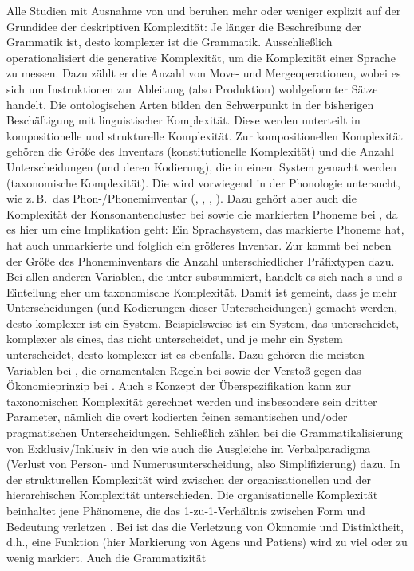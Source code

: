 Alle Studien mit Ausnahme von \citet{Sampson2001} und \citet{Garzonio2016} beruhen mehr oder weniger explizit auf der Grundidee der deskriptiven Komplexität: Je länger die Beschreibung der Grammatik ist, desto komplexer ist die Grammatik. Ausschließlich \citet{Garzonio2016} operationalisiert die generative Komplexität, um die Komplexität einer Sprache zu messen. Dazu zählt er die Anzahl von Move- und Mergeoperationen, wobei es sich um Instruktionen zur Ableitung (also Produktion) wohlgeformter Sätze handelt. Die ontologischen Arten bilden den Schwerpunkt in der bisherigen Beschäftigung mit linguistischer Komplexität. Diese werden unterteilt in kompositionelle und strukturelle Komplexität. Zur kompositionellen Komplexität gehören die Größe des Inventars (konstitutionelle Komplexität) und die Anzahl Unterscheidungen (und deren Kodierung), die in einem System gemacht werden (taxonomische Komplexität). Die  wird vorwiegend in der Phonologie untersucht, wie z.\,B.\ das \mbox{Phon-/}Pho\-nem\-in\-ven\-tar (\citealt{Jakobson1929}, \citealt{HayBauer2007}, \citealt{Nichols2016}, \citealt{Schreier2016}). Dazu gehört aber auch die Komplexität der Konsonantencluster bei \citet{Schreier2016} sowie die markierten Phoneme bei \citet{McWhorter2001}, da es hier um eine Implikation geht: Ein Sprachsystem, das markierte Phoneme hat, hat auch unmarkierte und folglich ein größeres Inventar. Zur  kommt bei \citet{Nichols2016} neben der Größe des Phoneminventars die Anzahl unterschiedlicher Präfixtypen dazu. Bei allen anderen Variablen, die \citet{Nichols2016} unter  subsummiert, handelt es sich nach \citeauthor{Rescher1998}s \citeyearpar{Rescher1998} und \citeauthor{Sinnemäki2011}s \citeyearpar{Sinnemäki2011} Einteilung eher um taxonomische Komplexität. Damit ist gemeint, dass je mehr Unterscheidungen (und Kodierungen dieser Unterscheidungen) gemacht werden, desto komplexer ist ein System. Beispielsweise ist ein System, das  unterscheidet, komplexer als eines, das  nicht unterscheidet, und je mehr  ein System unterscheidet, desto komplexer ist es ebenfalls. Dazu gehören die meisten Variablen bei \citet{Nichols2016}, die ornamentalen Regeln bei \citet{SzmrecsanyiKortmann2009} sowie der Verstoß gegen das Ökonomieprinzip bei \citet{Kusters2003}. Auch \citeauthor{McWhorter2001}s \citeyearpar{McWhorter2001} Konzept der Überspezifikation kann zur taxonomischen Komplexität gerechnet werden und insbesondere sein dritter Parameter, nämlich die overt kodierten feinen semantischen und/oder pragmatischen Unterscheidungen. Schließlich zählen bei \citet{Schreier2016} die Grammatikalisierung von Exklusiv/Inklusiv in den  wie auch die Ausgleiche im Verbalparadigma (Verlust von Person- und Numerusunterscheidung, also Simplifizierung) dazu. In der strukturellen Komplexität wird zwischen der organisationellen und der hierarchischen Komplexität unterschieden. Die organisationelle Komplexität beinhaltet jene Phänomene, die das 1-zu-1-Verhältnis zwischen Form und Bedeutung verletzen \citep[25]{Sinnemäki2011}. Bei \citet{Sinnemäki2009} ist das die Verletzung von Ökonomie und Distinktheit, d.h., eine Funktion (hier Markierung von Agens und Patiens) wird zu viel oder zu wenig markiert. Auch die Grammatizität 